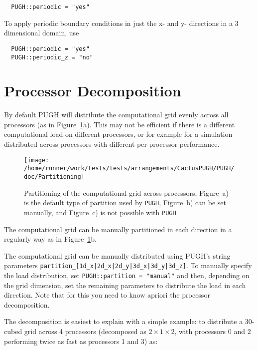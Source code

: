 \documentclass{article}
\begin{document}
\begin{verbatim}
  PUGH::periodic = "yes"
\end{verbatim}

To apply periodic boundary conditions in just the x- and y- directions in
a 3 dimensional domain, use

\begin{verbatim}
  PUGH::periodic = "yes"
  PUGH::periodic_z = "no"
\end{verbatim}


\section{Processor Decomposition}

By default PUGH will distribute the computational grid evenly across
all processors (as in Figure~\ref{pugh::fig2}a). This may not be
efficient if there is a different computational load on different
processors, or for example for a simulation distributed across
processors with different per-processor performance.

\begin{figure}[ht]
\begin{center}
\texttt{[image: /home/runner/work/tests/tests/arrangements/CactusPUGH/PUGH/doc/Partitioning]}
\end{center}
\caption[]{Partitioning of the computational grid across processors, Figure~a) is the default type of partition used by {\tt PUGH}, Figure~b) can be set
manually, and Figure~c) is not possible with {\tt PUGH}}
\label{pugh::fig2}
\end{figure}

The computational grid can be manually partitioned in each direction
in a regularly way as in Figure~\ref{pugh::fig2}b.

The computational grid can be manually distributed using PUGH's
string parameters \verb!partition_[1d_x|2d_x|2d_y|3d_x|3d_y|3d_z]!.
To manually specify the load distribution, set {\tt PUGH::partition = "manual"}
and then, depending on the grid dimension, set the remaining
parameters to distribute the load in each direction. Note that for
this you need to know apriori the processor decomposition.

The decomposition is easiest to explain with a simple example:
to distribute a 30-cubed grid across 4 processors (decomposed as $2 \times 1
\times 2$, with processors 0 and 2 performing twice as fast as processors 1
and 3) as:
\end{document}
